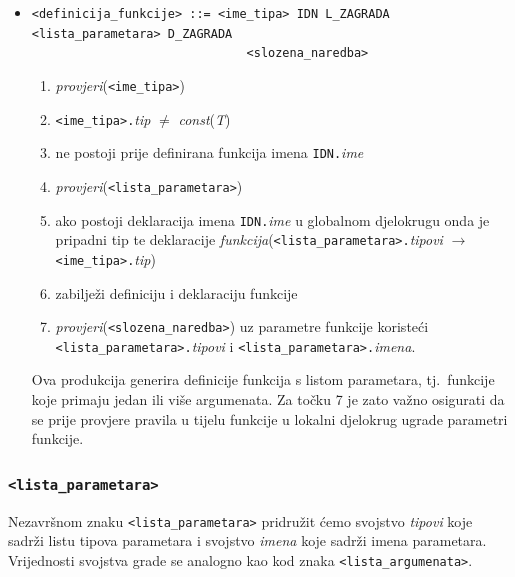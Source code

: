 \documentclass[times, 12pt, utf8]{book}
\begin{document}
\begin{itemize}
\item
\verb|<definicija_funkcije> ::= <ime_tipa> IDN L_ZAGRADA <lista_parametara> D_ZAGRADA|\\
\verb|                              <slozena_naredba>|
\begin{enumerate}
\item
\emph{provjeri}(\verb|<ime_tipa>|)
\item
\verb|<ime_tipa>.|\emph{tip} \(\neq\) \emph{const}(\emph{T})
\item
ne postoji prije definirana funkcija imena \verb|IDN.|\emph{ime}
\item
\emph{provjeri}(\verb|<lista_parametara>|)
\item
ako postoji deklaracija imena \verb|IDN.|\emph{ime} u globalnom djelokrugu onda je pripadni tip te deklaracije \emph{funkcija}(\verb|<lista_parametara>.|\emph{tipovi} \(\to\) \verb|<ime_tipa>.|\emph{tip})
\item
zabilježi definiciju i deklaraciju funkcije
\item
\emph{provjeri}(\verb|<slozena_naredba>|) uz parametre funkcije koristeći \verb|<lista_parametara>.|\emph{tipovi} i \verb|<lista_parametara>.|\emph{imena}.
\end{enumerate}

Ova produkcija generira definicije funkcija s listom parametara, tj.~funkcije koje primaju jedan ili više argumenata.
Za točku 7 je zato važno osigurati da se prije provjere pravila u tijelu funkcije u lokalni djelokrug ugrade parametri funkcije.

\end{itemize}

\subsubsection{\texttt{<lista\_parametara>}}

Nezavršnom znaku \verb|<lista_parametara>| pridružit ćemo svojstvo \emph{tipovi} koje sadrži listu tipova parametara i svojstvo \emph{imena} koje sadrži imena parametara.
Vrijednosti svojstva grade se analogno kao kod znaka \verb|<lista_argumenata>|.
\end{document}
